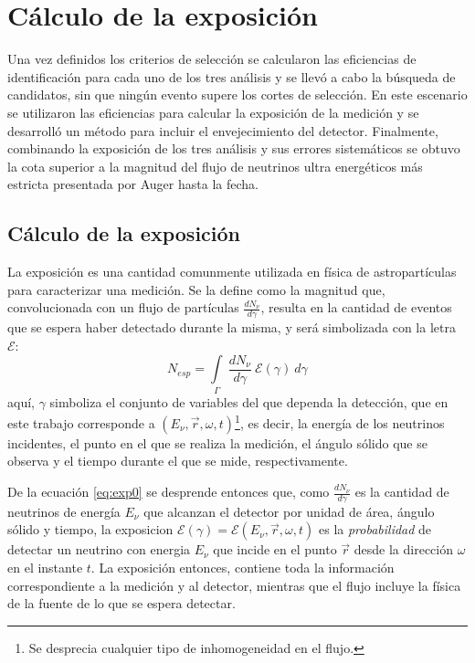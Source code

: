 \chapter{C\'alculo de la exposici\'on}
\label{ch:expAuger}

Una vez definidos los criterios de selección se calcularon las eficiencias de identificación para cada uno de los tres análisis y se llevó a cabo la búsqueda de candidatos, sin que ningún evento supere los cortes de selección.
En este escenario se utilizaron las eficiencias para calcular la exposición de la medición y se desarroll\'o un m\'etodo para incluir el envejecimiento del detector.
Finalmente, combinando la exposici\'on de los tres an\'alisis y sus errores sistem\'aticos se obtuvo la cota superior a la magnitud del flujo de neutrinos ultra energéticos m\'as estricta presentada por Auger hasta la fecha.

\section{C\'alculo de la exposici\'on}
\label{sc:expoNu}
	
	La exposición es una cantidad comunmente utilizada en física de astropartículas para caracterizar una medición.
	Se la define como la magnitud que, convolucionada con un flujo de partículas $\frac{dN_{\nu}}{d\gamma}$, resulta en la cantidad de eventos que se espera haber detectado durante la misma, y ser\'a simbolizada con la letra $\mathscr{E}$:
	\begin{equation}
	 N_{esp}=\int\limits_{\Gamma}~\frac{dN_{\nu}}{d\gamma}~\mathscr{E}(\gamma) ~d\gamma
	 \label{eq:exp0}
	\end{equation}
	aqu\'i, $\gamma$ simboliza el conjunto de variables del que dependa la detección, que en este trabajo corresponde a $(E_{\nu},\vec{r},\omega,t)$\footnote{Se desprecia cualquier tipo de inhomogeneidad en el flujo.}, es decir, la energía de los neutrinos incidentes, el punto en el que se realiza la medici\'on, el ángulo sólido que se observa y el tiempo durante el que se mide, respectivamente.
	
	De la ecuación \ref{eq:exp0} se desprende entonces que, como $\frac{dN_{\nu}}{d\gamma}$ es la cantidad de neutrinos de energía $E_{\nu}$ que alcanzan el detector por unidad de área, ángulo sólido y tiempo, la exposicion $\mathscr{E}(\gamma)=\mathscr{E}(E_{\nu},\vec{r},\omega,t)$ es la \emph{probabilidad} de detectar un neutrino con energia $E_\nu$ que incide en el punto $\vec{r}$ desde la direcci\'on $\omega$ en el instante $t$.
	La exposición entonces, contiene toda la información correspondiente a la medición y al detector, mientras que el flujo incluye la física de la fuente de lo que se espera detectar.
	

